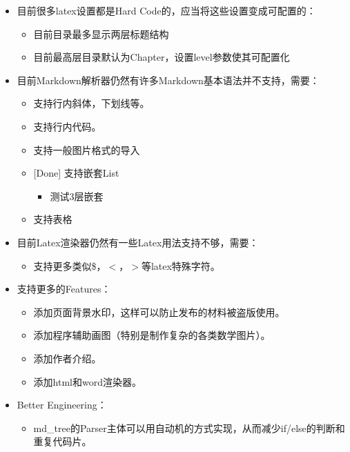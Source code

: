 \documentclass[12pt, letterpaper]{ctexrep}
\begin{document}
\begin{itemize}
\item{ 目前很多latex设置都是Hard Code的，应当将这些设置变成可配置的：
\begin{itemize}
\item{ 目前目录最多显示两层标题结构 }
\item{ 目前最高层目录默认为Chapter，设置level参数使其可配置化 }
\end{itemize}
 }
\item{ 目前Markdown解析器仍然有许多Markdown基本语法并不支持，需要：
\begin{itemize}
\item{ 支持行内斜体，下划线等。 }
\item{ 支持行内代码。 }
\item{ 支持一般图片格式的导入 }
\item{ [Done] 支持嵌套List
\begin{itemize}
\item{ 测试3层嵌套 }
\end{itemize}
 }
\item{ 支持表格 }
\end{itemize}
 }
\item{ 目前Latex渲染器仍然有一些Latex用法支持不够，需要：
\begin{itemize}
\item{ 支持更多类似\$，$<$，$>$等latex特殊字符。 }
\end{itemize}
 }
\item{ 支持更多的Features：
\begin{itemize}
\item{ 添加页面背景水印，这样可以防止发布的材料被盗版使用。 }
\item{ 添加程序辅助画图（特别是制作复杂的各类数学图片）。 }
\item{ 添加作者介绍。 }
\item{ 添加html和word渲染器。 }
\end{itemize}
 }
\item{ Better Engineering：
\begin{itemize}
\item{ md\_tree的Parser主体可以用自动机的方式实现，从而减少if/else的判断和重复代码片。 }
\end{itemize}
 }
\end{itemize}
\end{document}
